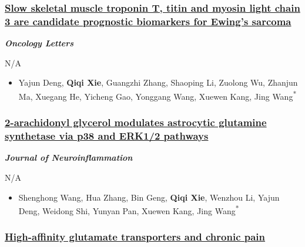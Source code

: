 \documentclass[
]{article}
\providecommand{\tightlist}{%
  \setlength{\itemsep}{0pt}\setlength{\parskip}{0pt}}
\begin{document}
\hypertarget{slow-skeletal-muscle-troponin-t-titin-and-myosin-light-chain-3-are-candidate-prognostic-biomarkers-for-ewings-sarcoma}{%
\subsubsection{\texorpdfstring{\href{https://doi.org/10.3892/ol.2019.11044}{Slow
skeletal muscle troponin T, titin and myosin light chain 3 are candidate
prognostic biomarkers for Ewing's
sarcoma}}{Slow skeletal muscle troponin T, titin and myosin light chain 3 are candidate prognostic biomarkers for Ewing's sarcoma}}\label{slow-skeletal-muscle-troponin-t-titin-and-myosin-light-chain-3-are-candidate-prognostic-biomarkers-for-ewings-sarcoma}}

\textbf{\emph{Oncology Letters}}

N/A

\begin{itemize}
\tightlist
\item
  Yajun Deng, \textbf{Qiqi Xie}, Guangzhi Zhang, Shaoping Li, Zuolong
  Wu, Zhanjun Ma, Xuegang He, Yicheng Gao, Yonggang Wang, Xuewen Kang,
  Jing Wang\textsuperscript{*}
\end{itemize}

\hypertarget{arachidonyl-glycerol-modulates-astrocytic-glutamine-synthetase-via-p38-and-erk12-pathways}{%
\subsubsection{\texorpdfstring{\href{https://doi.org/10.1186/s12974-018-1254-x}{2-arachidonyl
glycerol modulates astrocytic glutamine synthetase via p38 and ERK1/2
pathways}}{2-arachidonyl glycerol modulates astrocytic glutamine synthetase via p38 and ERK1/2 pathways}}\label{arachidonyl-glycerol-modulates-astrocytic-glutamine-synthetase-via-p38-and-erk12-pathways}}

\textbf{\emph{Journal of Neuroinflammation}}

N/A

\begin{itemize}
\tightlist
\item
  Shenghong Wang, Hua Zhang, Bin Geng, \textbf{Qiqi Xie}, Wenzhou Li,
  Yajun Deng, Weidong Shi, Yunyan Pan, Xuewen Kang, Jing
  Wang\textsuperscript{*}
\end{itemize}

\hypertarget{high-affinity-glutamate-transporters-and-chronic-pain}{%
\subsubsection{\texorpdfstring{\href{https://doi.org/10.11817/j.issn.1672-7347.2017.09.016}{High-affinity
glutamate transporters and chronic
pain}}{High-affinity glutamate transporters and chronic pain}}\label{high-affinity-glutamate-transporters-and-chronic-pain}}
\end{document}
